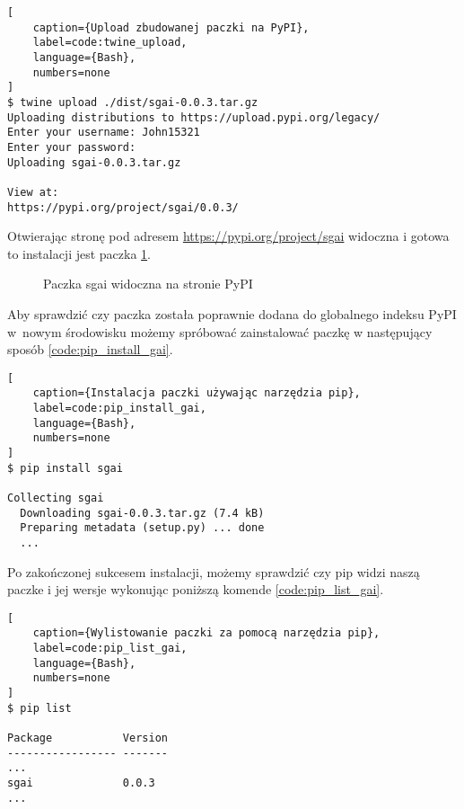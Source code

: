 \begin{onepage}
    \begin{lstlisting}[
    caption={Upload zbudowanej paczki na PyPI},
    label=code:twine_upload,
    language={Bash},
    numbers=none
]
$ twine upload ./dist/sgai-0.0.3.tar.gz
Uploading distributions to https://upload.pypi.org/legacy/
Enter your username: John15321
Enter your password:
Uploading sgai-0.0.3.tar.gz

View at:
https://pypi.org/project/sgai/0.0.3/
    \end{lstlisting}
\end{onepage}

\clearpage

Otwierając stronę pod adresem \url{https://pypi.org/project/sgai} widoczna i gotowa to instalacji jest paczka  \ref{img:sgai_on_pypi}.

\begin{figure}[h]
    \centering
    \caption{Paczka sgai widoczna na stronie PyPI}
    \label{img:sgai_on_pypi}
\end{figure}

Aby sprawdzić czy paczka została poprawnie dodana do globalnego indeksu PyPI w~nowym środowisku możemy spróbować zainstalować paczkę  w następujący sposób \ref{code:pip_install_gai}.

\begin{onepage}
    \begin{lstlisting}[
    caption={Instalacja paczki używając narzędzia pip},
    label=code:pip_install_gai,
    language={Bash},
    numbers=none
]
$ pip install sgai

Collecting sgai
  Downloading sgai-0.0.3.tar.gz (7.4 kB)
  Preparing metadata (setup.py) ... done
  ...
\end{lstlisting}
\end{onepage}

Po zakończonej sukcesem instalacji, możemy sprawdzić czy pip widzi naszą paczke i jej wersje wykonując poniższą komende \ref{code:pip_list_gai}.

\begin{onepage}
    \begin{lstlisting}[
    caption={Wylistowanie paczki za pomocą narzędzia pip},
    label=code:pip_list_gai,
    language={Bash},
    numbers=none
]
$ pip list

Package           Version
----------------- -------
...
sgai              0.0.3
...
\end{lstlisting}
\end{onepage}


